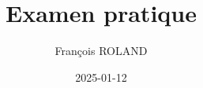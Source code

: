 \usepackage{amsmath,booktabs,enumitem,fontspec,graphicx,multicol,polyglossia,setspace,siunitx,titling,tikz,xcolor}

\date{2025-01-12} %
\title{Examen pratique}
\newcommand{\thesubtitle}{Programmation -- Bachelier en Techniques graphiques} %
\author{François ROLAND}

\footer{}{\thepage{}}{}
\setlength\linefillheight{.8cm}
\setlength\dottedlinefillheight{.8cm}

\usepackage[sfdefault]{roboto}
\usepackage{roboto-mono}
\usepackage[mathrm=sym]{unicode-math}


\setdefaultlanguage{french}

\usepackage{csquotes}

\usepackage{hyperref}

\onehalfspacing{}

\usetikzlibrary{angles,calc,quotes}

\newcommand{\insertdraftpage}{}

